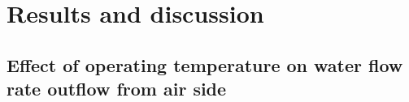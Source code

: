 \section{Results and discussion}
\subsection{Effect of operating temperature on water flow rate outflow from air side}
